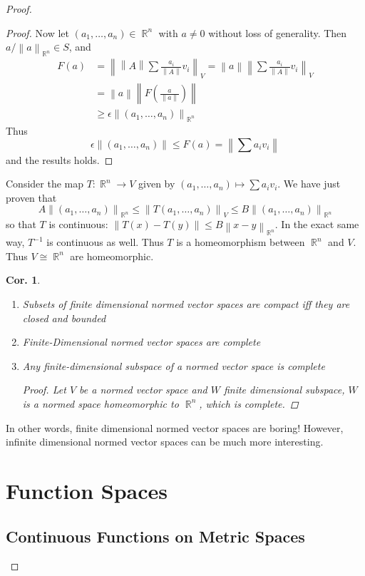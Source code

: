 \documentclass[12pt, a4paper]{book}
\DeclareMathOperator{\R}{\mathbb{R}}
\newcommand{\norm}[1]{\left\lVert#1\right\rVert} %
\newtheorem{corollary}[theorem]{Cor.}
\theoremstyle{nonumberplain}
\newtheorem{proof}{Proof}
\begin{document}
\begin{proof}
\begin{proof}
    Now let $(a_1,\ldots,a_n)\in\R^n$ with $a\neq 0$ without loss of generality. Then $a/\norm{a}_{\R^n}\in S$,
    and
    \begin{align*}
        F(a)&=\norm{\norm{A}\sum \frac{a_i}{\norm{A}}v_i}_V=\norm{a}\norm{\sum\frac{a_i}{\norm{A}}v_i}_V\\
        &= \norm{a}\norm{F\left( \frac{a}{\norm{a}} \right)}\\
        &\geq\epsilon\norm{(a_1,\ldots,a_n)}_{\R^n}
    \end{align*}
    Thus
    \[\epsilon\norm{(a_1,\ldots,a_n)}\leq F(a)=\norm{\sum a_iv_i}\]
    and the results holds.
\end{proof}
Consider the map $T:\R^n\to V$ given by $(a_1,\ldots,a_n)\mapsto\sum a_iv_i$. We have just proven that
\[A\norm{(a_1,\ldots,a_n)}_{\R^n}\leq\norm{T(a_1,\ldots,a_n)}_V\leq B\norm{(a_1,\ldots,a_n)}_{\R^n}\]
so that $T$ is continuous: $\norm{T(x)-T(y)}\leq B\norm{x-y}_{\R^n}$. In the exact same way, $T^{-1}$ is continuous as
well. Thus $T$ is a homeomorphism between $\R^n$ and $V$. Thus $V\cong\R^n$ are homeomorphic.
\begin{corollary}
    \begin{enumerate}
        \item Subsets of finite dimensional normed vector spaces are compact iff they are closed and bounded
        \item Finite-Dimensional normed vector spaces are complete
        \item Any finite-dimensional subspace of a normed vector space is complete
            \begin{proof}
                Let $V$ be a normed vector space and $W$ finite dimensional subspace, $W$ is a normed space homeomorphic
                to $\R^n$, which is complete.
            \end{proof}
    \end{enumerate}
\end{corollary}
In other words, finite dimensional normed vector spaces are boring! However, infinite dimensional normed vector spaces
can be much more interesting.
\chapter{Function Spaces}
\section{Continuous Functions on Metric Spaces}

\end{proof}
\end{document}
